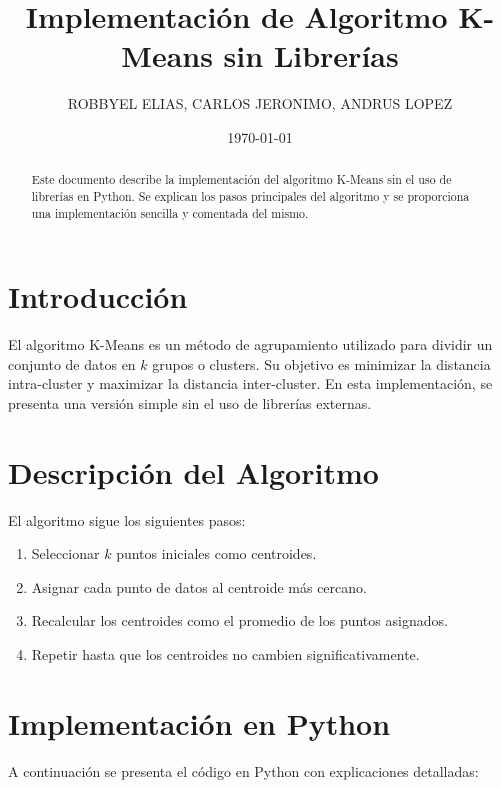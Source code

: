 \documentclass[a4paper, 10pt]{article}
\begin{document}
\title{Implementaci\'on de Algoritmo K-Means sin Librer\'ias}
\author{ROBBYEL ELIAS, CARLOS JERONIMO, ANDRUS LOPEZ}
\date{\today}
\maketitle

\begin{abstract}
Este documento describe la implementaci\'on del algoritmo K-Means sin el uso de librer\'ias en Python. Se explican los pasos principales del algoritmo y se proporciona una implementaci\'on sencilla y comentada del mismo.
\end{abstract}

\section{Introducci\'on}
El algoritmo K-Means es un m\'etodo de agrupamiento utilizado para dividir un conjunto de datos en $k$ grupos o clusters. Su objetivo es minimizar la distancia intra-cluster y maximizar la distancia inter-cluster. En esta implementaci\'on, se presenta una versi\'on simple sin el uso de librer\'ias externas.

\section{Descripci\'on del Algoritmo}
El algoritmo sigue los siguientes pasos:
\begin{enumerate}
    \item Seleccionar $k$ puntos iniciales como centroides.
    \item Asignar cada punto de datos al centroide m\'as cercano.
    \item Recalcular los centroides como el promedio de los puntos asignados.
    \item Repetir hasta que los centroides no cambien significativamente.
\end{enumerate}

\section{Implementaci\'on en Python}
A continuaci\'on se presenta el c\'odigo en Python con explicaciones detalladas:
\end{document}
